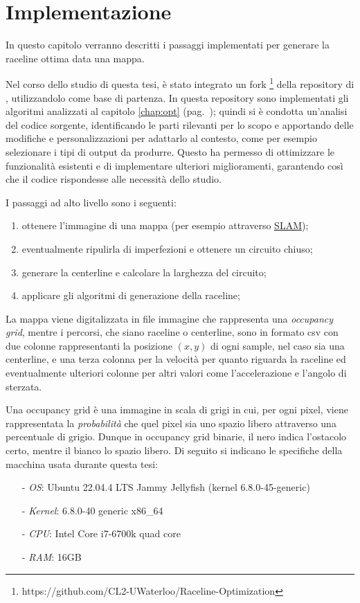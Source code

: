
\chapter{Implementazione}
\label{chap:impl}
In questo capitolo verranno descritti i passaggi implementati per generare la raceline ottima data una
mappa.

Nel corso dello studio di questa tesi, è stato integrato un fork
\footnote{https://github.com/CL2-UWaterloo/Raceline-Optimization} della repository di
\cite{christ2021time}, utilizzandolo come base di partenza. In questa repository sono implementati gli
algoritmi analizzati al capitolo \ref{chap:opt} (pag.~\pageref{chap:opt}); quindi si è condotta
un'analisi del codice sorgente, identificando le parti rilevanti per lo scopo e apportando delle
modifiche e personalizzazioni per adattarlo al contesto, come per esempio selezionare i tipi di output da
produrre. Questo ha permesso di ottimizzare le funzionalità esistenti e di implementare ulteriori
miglioramenti, garantendo così che il codice rispondesse alle necessità dello studio.

\bigskip
\noindent I passaggi ad alto livello sono i seguenti:
\begin{enumerate}
	\item ottenere l'immagine di una mappa (per esempio attraverso \hyperref[par:slam]{SLAM});
	\item eventualmente ripulirla di imperfezioni e ottenere un circuito chiuso; 
	\item generare la centerline e calcolare la larghezza del circuito;
	\item applicare gli algoritmi di generazione della raceline;
\end{enumerate}
La mappa viene digitalizzata in file immagine che rappresenta una \textit{occupancy grid}, mentre i
percorsi, che siano raceline o centerline, sono in formato csv con due colonne rappresentanti la
posizione $(x,y)$ di ogni sample, nel caso sia una centerline, e una terza colonna per la velocità per
quanto riguarda la raceline ed eventualmente ulteriori colonne per altri valori come l'accelerazione e
l'angolo di sterzata.

Una occupancy grid è una immagine in scala di grigi in cui, per ogni pixel, viene rappresentata la
\textit{probabilità} che quel pixel sia uno spazio libero attraverso una percentuale di grigio. Dunque in
occupancy grid binarie, il nero indica l'ostacolo certo, mentre il bianco lo spazio libero.
\newpage
Di seguito si indicano le specifiche della macchina usata durante questa tesi:
\begin{itemize}
	\item[-] \textit{OS}: Ubuntu 22.04.4 LTS Jammy Jellyfish (kernel 6.8.0-45-generic)
	\item[-] \textit{Kernel}: 6.8.0-40 generic x86\_64
	\item[-] \textit{CPU}: Intel Core i7-6700k quad core
	\item[-] \textit{RAM}: 16GB
\end{itemize}

